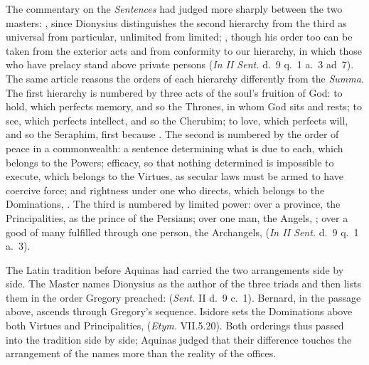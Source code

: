 The commentary on the \emph{Sentences} had judged more sharply between the
two masters: , since Dionysius
distinguishes the second hierarchy from the third as universal from
particular, unlimited from limited; , though his order too can be taken from the
exterior acts and from conformity to our hierarchy, in which those who have
prelacy stand above private persons (\emph{In II Sent.} d.~9 q.~1 a.~3
ad~7). The same article reasons the orders of each hierarchy differently from
the \emph{Summa}. The first hierarchy is numbered by three acts of the
soul's fruition of God: to hold, which perfects memory, and so the Thrones,
in whom God sits and rests; to see, which perfects intellect, and so the
Cherubim; to love, which perfects will, and so the Seraphim, first because
. The second is numbered by the
order of peace in a commonwealth: a sentence determining what is due to
each, which belongs to the Powers; efficacy, so that nothing determined is
impossible to execute, which belongs to the Virtues, as secular laws must be
armed to have coercive force; and rightness under one who directs, which
belongs to the Dominations, . The
third is numbered by limited power: over a province, the Principalities, as
the prince of the Persians; over one man, the Angels, ; over a good of many fulfilled through one person,
the Archangels,  (\emph{In II Sent.} d.~9 q.~1 a.~3).

The Latin tradition before Aquinas had carried the two arrangements side by
side. The Master names Dionysius as the author of the three triads and then
lists them in the order Gregory preached:  (\emph{Sent.} II d.~9 c.~1). Bernard, in the
passage above, ascends through Gregory's sequence. Isidore sets the
Dominations above both Virtues and Principalities,  (\emph{Etym.} VII.5.20). Both
orderings thus passed into the tradition side by side; Aquinas judged that
their difference touches the arrangement of the names more than the reality
of the offices.

